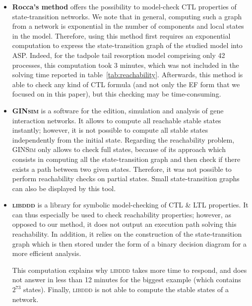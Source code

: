 \begin{itemize}

\item \textbf{Rocca's method} offers the possibility to model-check CTL properties
of state-transition networks.
We note that in general, computing such a graph from a network is exponential in the number of components and local states in the model.
Therefore, using this method first requires an exponential computation to
express the state-transition graph of the studied model into ASP.
Indeed, for the tadpole tail resorption model comprising only 42 processes,
this computation took 3 minutes, which was not included in the solving time
reported in table~\ref{tab:reachability}.
Afterwards, this method is able to check any kind of CTL formula
(and not only the EF form that we focused on in this paper),
but this checking may be time-consuming.

\item \textbf{\textsc{GINsim}} is a software for the edition, simulation and analysis
of gene interaction networks.
It allows to compute all reachable stable states instantly;
however, it is not possible to compute all stable states independently from the initial state.
Regarding the reachability problem, \textsc{GINSim} only allows to check
full states, because of its approach which consists in computing
all the state-transition graph
 
and then check if there exists a path between two given states.
Therefore, it was not possible to perform reachability checks on partial states.
Small state-transition graphs can also be displayed by this tool.

\item \textbf{\textsc{libddd}}
is a library for symbolic model-checking of CTL \& LTL properties.
It can thus especially be used to check reachability properties;
however, as opposed to our method, it does not output an execution path
solving this reachability.
In addition, it relies on the construction of the state-transition graph
which is then stored under the form of a binary decision diagram for a more efficient analysis.

This computation explains why \textsc{libddd} takes more time to respond,
and does not answer in less than 12 minutes for the biggest example
(which contains $2^{73}$ states).
Finally, \textsc{libddd} is not able to compute the stable states of a network.


\end{itemize}
